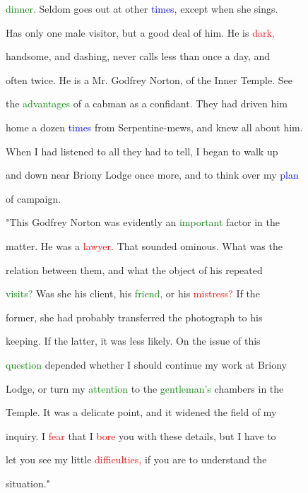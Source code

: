  \textcolor{green}{dinner.} Seldom goes out at other \textcolor{blue}{times,} except when she sings.

 Has only one male \textcolor{BurntOrange}{visitor,} but a \textcolor{BurntOrange}{good} \textcolor{BurntOrange}{deal} of him. He is \textcolor{red}{dark,}

 handsome, and dashing, never calls less than once a day, and

 often twice. He is a Mr. Godfrey Norton, of the Inner Temple. See

 the \textcolor{green}{advantages} of a cabman as a confidant. They had driven him

 home a dozen \textcolor{blue}{times} from Serpentine-mews, and knew all about him.

 When I had listened to all they had to tell, I began to walk up

 and down near Briony Lodge once more, and to think over my \textcolor{blue}{plan}

 of campaign.



 "This Godfrey Norton was evidently an \textcolor{green}{important} factor in the

 matter. He was a \textcolor{red}{lawyer.} That sounded \textcolor{BurntOrange}{ominous.} What was the

 relation between them, and what the object of his repeated

 \textcolor{green}{visits?} Was she his client, his \textcolor{green}{friend,} or his \textcolor{red}{mistress?} If the

 former, she had probably transferred the photograph to his

 keeping. If the latter, it was less likely. On the issue of this

 \textcolor{green}{question} \textcolor{BurntOrange}{depended} whether I should \textcolor{BurntOrange}{continue} my work at Briony

 Lodge, or turn my \textcolor{green}{attention} to the \textcolor{green}{gentleman's} chambers in the

 Temple. It was a delicate point, and it widened the field of my

 \textcolor{BurntOrange}{inquiry.} I \textcolor{red}{fear} that I \textcolor{red}{bore} you with these details, but I have to

 let you see my little \textcolor{red}{difficulties,} if you are to understand the

 situation."



